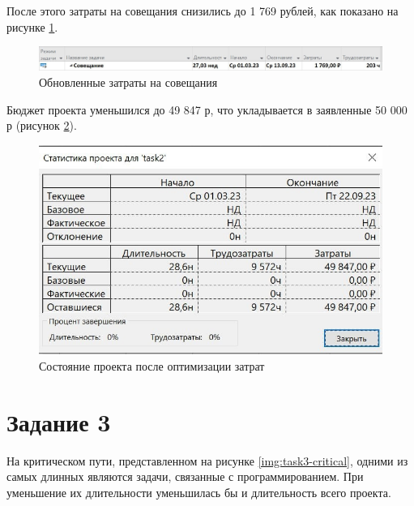 После этого затраты на совещания снизились до 1 769 рублей, как показано на рисунке \ref{img:task2-low}.

\begin{figure}[H]
	\begin{center}
		\includegraphics[scale=0.3]{inc/img/task2-low.jpg}
	\end{center}
	\captionsetup{justification=centering}
	\caption{Обновленные затраты на совещания}
	\label{img:task2-low}
\end{figure}

Бюджет проекта уменьшился до 49 847 р, что укладывается в заявленные 50 000 р (рисунок \ref{img:task2-low-budget}).

\begin{figure}[H]
	\begin{center}
		\includegraphics[scale=0.3]{inc/img/task2-low-budget.jpg}
	\end{center}
	\captionsetup{justification=centering}
	\caption{Состояние проекта после оптимизации затрат}
	\label{img:task2-low-budget}
\end{figure}

\section*{Задание 3}

На критическом пути, представленном на рисунке \ref{img:task3-critical}, одними из самых длинных являются задачи, связанные с программированием. При уменьшение их длительности уменьшилась бы и длительность всего проекта.

